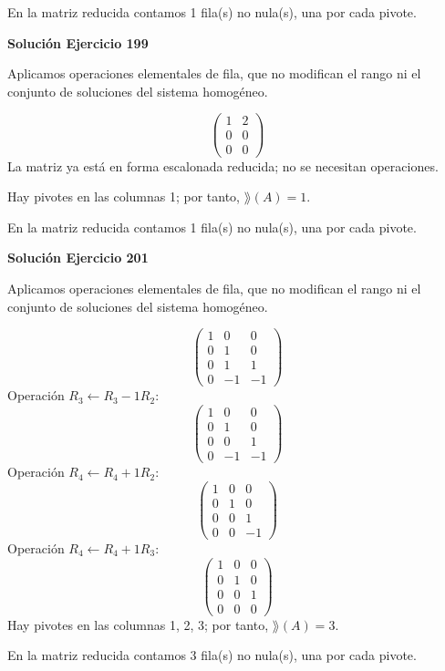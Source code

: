 En la matriz reducida contamos 1 fila(s) no nula(s), una por cada pivote.


\par\bigskip\noindent\textbf{Solución Ejercicio 199}\par\nobreak
Aplicamos operaciones elementales de fila, que no modifican el rango ni el conjunto de soluciones del sistema homogéneo.

\[
\begin{pmatrix}1&2\\0&0\\0&0\end{pmatrix}
\]
La matriz ya está en forma escalonada reducida; no se necesitan operaciones.

Hay pivotes en las columnas 1; por tanto, $\boxed{\rang(A)=1}$.

En la matriz reducida contamos 1 fila(s) no nula(s), una por cada pivote.


\par\bigskip\noindent\textbf{Solución Ejercicio 201}\par\nobreak
Aplicamos operaciones elementales de fila, que no modifican el rango ni el conjunto de soluciones del sistema homogéneo.

\[
\begin{pmatrix}1&0&0\\0&1&0\\0&1&1\\0&-1&-1\end{pmatrix}
\]
Operación $R_{3}\leftarrow R_{3}-1R_{2}$:
\[
\begin{pmatrix}1&0&0\\0&1&0\\0&0&1\\0&-1&-1\end{pmatrix}
\]
Operación $R_{4}\leftarrow R_{4}+1R_{2}$:
\[
\begin{pmatrix}1&0&0\\0&1&0\\0&0&1\\0&0&-1\end{pmatrix}
\]
Operación $R_{4}\leftarrow R_{4}+1R_{3}$:
\[
\begin{pmatrix}1&0&0\\0&1&0\\0&0&1\\0&0&0\end{pmatrix}
\]
Hay pivotes en las columnas 1, 2, 3; por tanto, $\boxed{\rang(A)=3}$.

En la matriz reducida contamos 3 fila(s) no nula(s), una por cada pivote.


